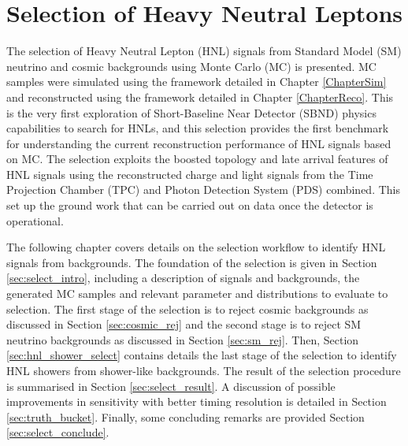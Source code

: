 \chapter{Selection of Heavy Neutral Leptons}
\label{ChapterSelect}

\ifpdf
    \graphicspath{{Chapter9/Figs/Raster/}{Chapter9/Figs/PDF/}{Chapter9/Figs/}}
\else
    \graphicspath{{Chapter9/Figs/Vector/}{Chapter9/Figs/}}
\fi


The selection of Heavy Neutral Lepton (HNL) signals from Standard Model (SM) neutrino and cosmic backgrounds using Monte Carlo (MC) is presented.  
MC samples were simulated using the framework detailed in Chapter \ref{ChapterSim} and reconstructed using the framework detailed in Chapter \ref{ChapterReco}.
This is the very first exploration of Short-Baseline Near Detector (SBND) physics capabilities to search for HNLs, and this selection provides the first benchmark for understanding the current reconstruction performance of HNL signals based on MC.
The selection exploits the boosted topology and late arrival features of HNL signals using the reconstructed charge and light signals from the Time Projection Chamber (TPC) and Photon Detection System (PDS) combined.
This set up the ground work that can be carried out on data once the detector is operational.

The following chapter covers details on the selection workflow to identify HNL signals from backgrounds.
The foundation of the selection is given in Section \ref{sec:select_intro}, including a description of signals and backgrounds, the generated MC samples and relevant parameter and distributions to evaluate to selection.
The first stage of the selection is to reject cosmic backgrounds as discussed in Section \ref{sec:cosmic_rej} and the second stage is to reject SM neutrino backgrounds as discussed in Section \ref{sec:sm_rej}.
Then, Section \ref{sec:hnl_shower_select} contains details the last stage of the selection to identify HNL showers from shower-like backgrounds.
The result of the selection procedure is summarised in Section \ref{sec:select_result}.
A discussion of possible improvements in sensitivity with better timing resolution is detailed in Section \ref{sec:truth_bucket}.
Finally, some concluding remarks are provided Section \ref{sec:select_conclude}.

